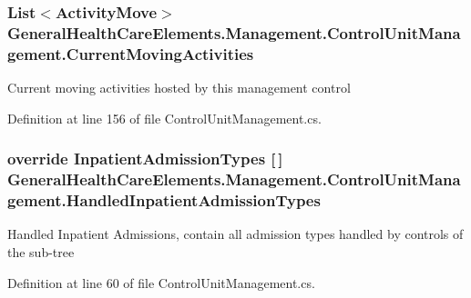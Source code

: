 \subsubsection[{\texorpdfstring{Current\+Moving\+Activities}{CurrentMovingActivities}}]{\setlength{\rightskip}{0pt plus 5cm}List$<${\bf Activity\+Move}$>$ General\+Health\+Care\+Elements.\+Management.\+Control\+Unit\+Management.\+Current\+Moving\+Activities\hspace{0.3cm}{\ttfamily [get]}}\hypertarget{class_general_health_care_elements_1_1_management_1_1_control_unit_management_ac15d5ab2f2587c9326586aa0ac5312c0}{}\label{class_general_health_care_elements_1_1_management_1_1_control_unit_management_ac15d5ab2f2587c9326586aa0ac5312c0}


Current moving activities hosted by this management control 



Definition at line 156 of file Control\+Unit\+Management.\+cs.

\subsubsection[{\texorpdfstring{Handled\+Inpatient\+Admission\+Types}{HandledInpatientAdmissionTypes}}]{\setlength{\rightskip}{0pt plus 5cm}override {\bf Inpatient\+Admission\+Types} \mbox{[}$\,$\mbox{]} General\+Health\+Care\+Elements.\+Management.\+Control\+Unit\+Management.\+Handled\+Inpatient\+Admission\+Types\hspace{0.3cm}{\ttfamily [get]}}\hypertarget{class_general_health_care_elements_1_1_management_1_1_control_unit_management_a649f83137a13ad5a988135af4f46a331}{}\label{class_general_health_care_elements_1_1_management_1_1_control_unit_management_a649f83137a13ad5a988135af4f46a331}


Handled Inpatient Admissions, contain all admission types handled by controls of the sub-\/tree 



Definition at line 60 of file Control\+Unit\+Management.\+cs.

